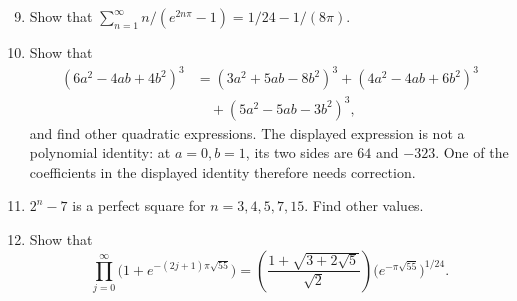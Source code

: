 \documentclass[11pt,a4paper]{article}
\begin{document}
\begin{enumerate}[label=\arabic*.]
\setcounter{enumi}{8}\item Show that $\sum_{n=1}^\infty n/(e^{2n\pi}-1)=1/24-1/(8\pi)$.
\setcounter{enumi}{9}\item Show that
\begin{align*}
(6a^2-4ab+4b^2)^3
&=(3a^2+5ab-8b^2)^3+(4a^2-4ab+6b^2)^3\\
&\quad +(5a^2-5ab-3b^2)^3,
\end{align*}
and find other quadratic expressions.
The displayed expression is not a polynomial identity: at
$a=0,b=1$, its two sides are $64$ and $-323$. One of the coefficients in
the displayed identity therefore needs correction.
\setcounter{enumi}{10}\item $2^n-7$ is a perfect square for $n=3,4,5,7,15$. Find other values.
\setcounter{enumi}{11}\item Show that
\[
\prod_{j=0}^\infty\bigl(1+e^{-(2j+1)\pi\sqrt{55}}\bigr)
=\left(\frac{1+\sqrt{3+2\sqrt5}}{\sqrt2}\right)
\bigl(e^{-\pi\sqrt{55}}\bigr)^{1/24}.
\]
\end{enumerate}
\end{document}
